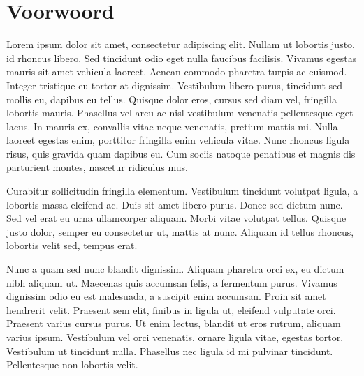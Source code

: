 \documentclass[a4paper,10pt,titlepage]{article}
\def\s{\section}                              %
\begin{document}



\newpage
\tableofcontents
\newpage

\s*{Voorwoord}

Lorem ipsum dolor sit amet, consectetur adipiscing elit. Nullam ut lobortis justo, id rhoncus libero. Sed tincidunt odio eget nulla faucibus facilisis. Vivamus egestas mauris sit amet vehicula laoreet. Aenean commodo pharetra turpis ac euismod. Integer tristique eu tortor at dignissim. Vestibulum libero purus, tincidunt sed mollis eu, dapibus eu tellus. Quisque dolor eros, cursus sed diam vel, fringilla lobortis mauris. Phasellus vel arcu ac nisl vestibulum venenatis pellentesque eget lacus. In mauris ex, convallis vitae neque venenatis, pretium mattis mi. Nulla laoreet egestas enim, porttitor fringilla enim vehicula vitae. Nunc rhoncus ligula risus, quis gravida quam dapibus eu. Cum sociis natoque penatibus et magnis dis parturient montes, nascetur ridiculus mus.
\null

\null

Curabitur sollicitudin fringilla elementum. Vestibulum tincidunt volutpat ligula, a lobortis massa eleifend ac. Duis sit amet libero purus. Donec sed dictum nunc. Sed vel erat eu urna ullamcorper aliquam. Morbi vitae volutpat tellus. Quisque justo dolor, semper eu consectetur ut, mattis at nunc. Aliquam id tellus rhoncus, lobortis velit sed, tempus erat.
\null

\null

Nunc a quam sed nunc blandit dignissim. Aliquam pharetra orci ex, eu dictum nibh aliquam ut. Maecenas quis accumsan felis, a fermentum purus. Vivamus dignissim odio eu est malesuada, a suscipit enim accumsan. Proin sit amet hendrerit velit. Praesent sem elit, finibus in ligula ut, eleifend vulputate orci. Praesent varius cursus purus. Ut enim lectus, blandit ut eros rutrum, aliquam varius ipsum. Vestibulum vel orci venenatis, ornare ligula vitae, egestas tortor. Vestibulum ut tincidunt nulla. Phasellus nec ligula id mi pulvinar tincidunt. Pellentesque non lobortis velit.
\null
\end{document}
